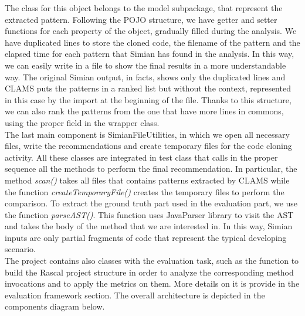 The class for this object belongs to the model subpackage, that represent the extracted pattern. Following the POJO structure, we have getter and setter functions for each property of the object, gradually filled during the analysis. We have duplicated lines to store the cloned code, the filename of the pattern and the elapsed time for each pattern that Simian has found in the analysis. In this way, we can easily write in a file to show the final results in a more understandable way. The original Simian output, in facts, shows only the duplicated lines and CLAMS puts the patterns in a ranked list but without the context, represented in this case by the import at the beginning of the file. Thanks to this structure, we can also rank the patterns from the one that have more lines in commons, using the proper field in the wrapper class.\\
The last main component is SimianFileUtilities, in which we open all necessary files, write the recommendations and create temporary files for the code cloning activity. All these classes are integrated in test class that calls in the proper sequence all the methods to perform the final recommendation. In particular, the method \textit{scan()} takes all files that contains patterns extracted by CLAMS while the function \textit{createTemporaryFile()} creates the temporary files to perform the comparison. To extract the ground truth part used in the evaluation part, we use the function \textit{parseAST()}. This function uses JavaParser library to visit the AST and takes the body of the method that we are interested in. In this way, Simian inputs are only partial fragments of code that represent the typical developing scenario. \\
The project contains also classes with the evaluation task, such as the function to build the Rascal project structure in order to analyze the corresponding method invocations and to apply the metrics on them. More details on it is provide in the evaluation framework section. 
The overall architecture is depicted in the components diagram below.
